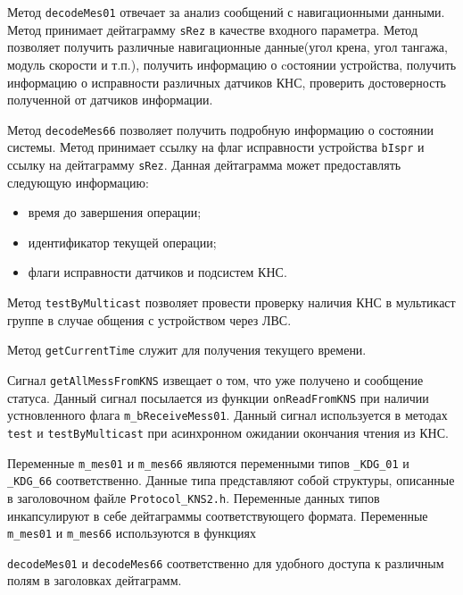 \begin{enum}
	\item Метод \texttt{decodeMes01} отвечает за анализ сообщений с навигационными данными. Метод принимает
		дейтаграмму \texttt{sRez} в качестве входного параметра. Метод позволяет получить
		различные навигационные данные(угол крена, угол тангажа, модуль скорости и т.п.), получить информацию о
		cостоянии устройства, получить информацию о исправности различных датчиков КНС, проверить достоверность
		полученной от датчиков информации.

	\item Метод \texttt{decodeMes66} позволяет получить подробную информацию о состоянии системы. Метод принимает
		ссылку на флаг исправности устройства \texttt{bIspr} и ссылку на дейтаграмму \texttt{sRez}. Данная
		дейтаграмма может предоставлять следующую информацию:
		\begin{itemize}
				\item время до завершения операции;
				\item идентификатор текущей операции;
				\item флаги исправности датчиков и подсистем КНС.
		\end{itemize}

	\item Метод \texttt{testByMulticast} позволяет провести проверку наличия КНС в мультикаст группе в случае
		общения с устройством через ЛВС.

	\item Метод \texttt{getCurrentTime} служит для получения текущего времени.

	\item Сигнал \texttt{getAllMessFromKNS} извещает о том, что уже получено и сообщение статуса. Данный сигнал
		посылается из функции \texttt{onReadFromKNS} при наличии
		устновленного флага
		\texttt{m\_bReceiveMess01}. Данный сигнал используется в методах
		\texttt{test} и \texttt{testByMulticast} при асинхронном ожидании окончания чтения из КНС.

	\item Переменные \texttt{m\_mes01} и \texttt{m\_mes66} являются переменными типов \texttt{\_KDG\_01} и
		\texttt{\_KDG\_66} соответственно. Данные типа представляют собой структуры, описанные в заголовочном
		файле \texttt{Protocol\_KNS2.h}. Переменные данных типов инкапсулируют в себе дейтаграммы
		соответствующего формата. Переменные \texttt{m\_mes01} и \texttt{m\_mes66} используются в функциях

		\texttt{decodeMes01} и \texttt{decodeMes66} соответственно для удобного доступа к различным полям в
		заголовках дейтаграмм.
\end{enum}

